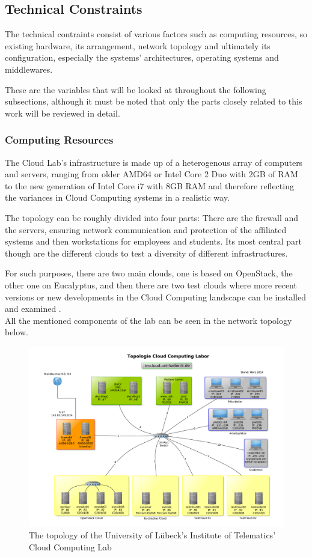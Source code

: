 \subsection{Technical Constraints}
\label{subsec:technical-constraints}
The technical contraints consist of various factors such as computing resources, so existing hardware, its arrangement, network topology and ultimately its configuration, especially the systems' architectures, operating systems and middlewares.

These are the variables that will be looked at throughout the following subsections, although it must be noted that only the parts closely related to this work will be reviewed in detail.

\subsubsection{Computing Resources}
\label{subsubsec:computing-resources}
The Cloud Lab's infrastructure is made up of a heterogenous array of computers and servers, ranging from older AMD64 or Intel Core 2 Duo with 2GB of RAM to the new generation of Intel Core i7 with 8GB RAM and therefore reflecting the variances in Cloud Computing systems in a realistic way. 

The topology can be roughly divided into four parts: There are the firewall and the  servers, ensuring network communication and protection of the affiliated systems and then workstations for employees and students. Its most central part though are the different clouds to test a diversity of different infrastructures. 

For such purposes, there are two main clouds, one is based on OpenStack, the other one on Eucalyptus, and then there are two test clouds where more recent versions or new developments in the Cloud Computing landscape can be installed and examined \cite{website:openstack} \cite{website:eucalyptus}. \\
All the mentioned components of the lab can be seen in the network topology below.

\begin{figure}[H]
	\centering
		\includegraphics[width=\textwidth]{images/itm-topology.pdf}
	\caption{The topology of the University of L\"ubeck's Institute of Telematics' Cloud Computing Lab}
\end{figure}

